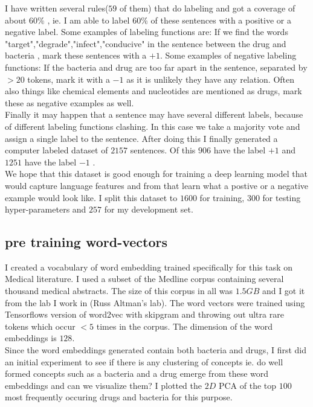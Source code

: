 \documentclass{article} %
\begin{document}
I have written several rules($59$ of them) that do labeling and got  a coverage of about $60\%$ , ie. I am able to label $60\%$ of these sentences with a positive or a negative label.  Some examples of labeling functions are: If we find the words "target","degrade","infect","conducive" in the sentence between the drug and bacteria , mark these sentences with a $+1$. Some examples of negative labeling functions: If the bacteria and drug are too far apart in the sentence, separated by $ >20$ tokens, mark it with a $-1$ as it is unlikely they have any relation. Often also things like chemical elements and nucleotides are mentioned as drugs, mark these as negative examples as well. \\
Finally it may happen that a sentence may have several different labels, because of different labeling functions clashing. In this case we take  a majority vote and assign a single label to the sentence. After doing this I finally generated a computer labeled dataset of  $2157$ sentences. Of this $906$ have the label $+1$ and $1251$ have the label $-1$ . \\
We hope that this dataset is good enough for training a deep learning model that would capture language features and from that learn what a postive or a negative example would look like. I split this dataset to $1600$ for training, $300$ for testing hyper-parameters and $257$ for my development set.

\subsection{pre training word-vectors}
I created a vocabulary of word embedding trained specifically for this task on Medical literature. I used a subset of the Medline corpus containing several thousand medical abstracts. The size of this corpus in all was $1.5GB$ and I got it from the lab I work in (Russ Altman's lab). The word vectors were trained using Tensorflows version of word2vec with skipgram and throwing out ultra rare tokens which occur $<5$ times in the corpus. The dimension of the word embeddings is $128$. \\
Since the word embeddings generated contain both bacteria and drugs, I first did an initial experiment to see if there is any clustering of concepts ie. do well formed concepts such as a bacteria and a drug emerge from these word embeddings and can we visualize them? I plotted the $2D$ PCA of the top $100$ most frequently occuring drugs and bacteria for this purpose.\\
\end{document}
